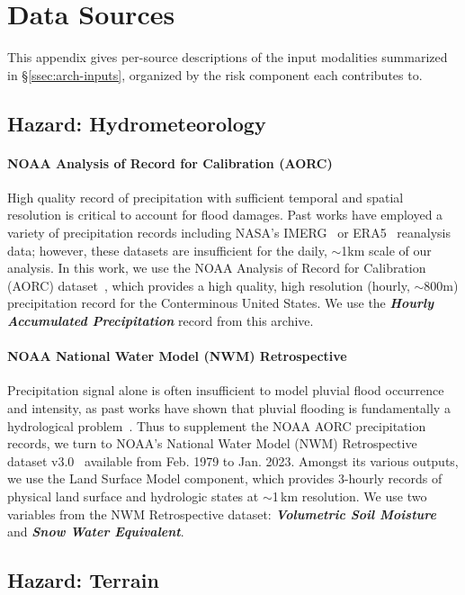 \section{Data Sources}
\label{app:data-sources}
This appendix gives per-source descriptions of the input modalities summarized in \S\ref{ssec:arch-inputs}, organized by the risk component each contributes to.

\subsection{Hazard: Hydrometeorology}
\paragraph{NOAA Analysis of Record for Calibration (AORC)}
High quality record of precipitation with sufficient temporal and spatial resolution is critical to account for flood damages.
%
Past works have employed a variety of precipitation records including NASA's IMERG~\cite{huffman_integrated_2020} or ERA5~\cite{hersbach_era5_2020} reanalysis data; however, these datasets are insufficient for the daily, $\sim$1km scale of our analysis.
%
In this work, we use the NOAA Analysis of Record for Calibration (AORC) dataset~\cite{fall_analysis_2023}, which provides a high quality, high resolution (hourly, $\sim$800m) precipitation record for the Conterminous United States.
%
We use the \textbf{\textit{Hourly Accumulated Precipitation}} record from this archive.

\paragraph{NOAA National Water Model (NWM) Retrospective}
Precipitation signal alone is often insufficient to model pluvial flood occurrence and intensity, as past works have shown that pluvial flooding is fundamentally a hydrological problem~\cite{james_precipitation_2024}.
%
Thus to supplement the NOAA AORC precipitation records, we turn to NOAA's National Water Model (NWM) Retrospective dataset v3.0~\cite{cosgrove_noaas_2024} available from Feb. 1979 to Jan. 2023.
%
Amongst its various outputs, we use the Land Surface Model component, which provides 3-hourly records of physical land surface and hydrologic states at $\sim$1\,km resolution.
%
We use two variables from the NWM Retrospective dataset: \textbf{\textit{Volumetric Soil Moisture}} and \textbf{\textit{Snow Water Equivalent}}.

\subsection{Hazard: Terrain}

